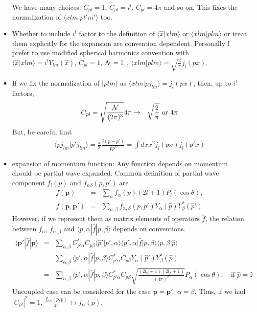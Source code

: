 \documentclass[10pt]{book}
\def\bm{\boldsymbol}
\newcommand{\bea}{\begin{eqnarray}}
\newcommand{\eea}{\end{eqnarray}}
\newcommand{\no}{\nonumber \\}
\def\vp{{\bm p}}
\def\la{\langle}
\def\ra{\rangle}
\begin{document}
\begin{itemize}
  We have many choices: $C_{pl}=1$, $C_{pl}=i^l$, $C_{pl}=4\pi$
  and so on. This fixes the normalization of $\la xlm|p l'm'\ra$ too.

\item Whether to include $i^l$ factor to 
the definition of $\la \hat{x}|xlm\ra$ or $\la xlm|plm\ra $ or treat them explicitly
for the expansion are convention dependent. 
Personally I prefer to use modified spherical harmonics convention with 
$\la \hat{x}|xlm\ra =i^l Y_{lm}(\hat{x})$, 
$C_{pl}=1$, 
${\cal N}=1$ , $\la xlm|plm\ra =\sqrt{\frac{2}{\pi} }j_l(px)$.

\item If we fix the normalization of $|p lm\ra $ as
      $\la x lm|p j_{lm}\ra=j_l(px)$, then, up to $i^{l}$ factors,
      \bea 
      C_{pl}=\sqrt{\frac{\cal N}{(2\pi)^3}}4\pi&\to& \sqrt{\frac{2}{\pi}}
                                     \mbox{ or } 4\pi 
      \eea 
      But, be careful that
      \bea 
      \la p j_{lm}|p' j_{lm}\ra =\frac{\pi}{2}\frac{\delta(p-p')}{pp'}
                        =\int dx x^2 j_l(px) j_l(p'x) 
      \eea 
\item expansion of momentum function: Any function depends on momentum chould be partial wave expanded.
      Common definition of partial wave component $f_l(p)$ and $f_{\alpha\beta}(p,p')$ are
      \bea 
      f(\vp)&=&\sum_{\alpha} f_{\alpha}(p) (2l+1) P_l(\cos\theta) ,\no
      f(\vp,\vp')&=&\sum_{\alpha,\beta} f_{\alpha,\beta}(p,p') Y_\alpha(\hat{p}) Y^*_\beta(\hat{p}')   
      \eea 
      However, if we represent them as matrix elements of operators $\hat{f}$, 
      the relation between $f_{\alpha}$, $f_{\alpha,\beta}$ and $\la p,\alpha|\hat{f}|p,\beta\ra $
      depends on conventions.
      \bea 
      \la \vp'|\hat{f}|\vp\ra 
      &=&\sum_{\alpha,\beta} C^*_{p'\alpha} C_{p\beta}\la \hat{p}'|p',\alpha\ra\la p',\alpha|
                           \hat{f}|p,\beta\ra \la p,\beta|\hat{p}\ra \no 
      &=&\sum_{\alpha,\beta} \la p',\alpha|
                                 \hat{f}|p,\beta\ra 
                                C^*_{p'\alpha} C_{p\beta} 
                          Y_\alpha(\hat{p}') Y^*_{\beta}(\hat{p})\no
      &=&\sum_{\alpha,\beta} \la p',\alpha|
                                 \hat{f}|p,\beta\ra 
                                C^*_{p'\alpha} C_{p\beta} 
                          \sqrt{\frac{(2l_\alpha+1)(2l_\beta+1)}{(4\pi)^2}}
                          P_\alpha(\cos\theta),\quad \mbox{if }\hat{p}=\hat{z}
      \eea 
      Uncoupled case can be considered for the case $\vp=\vp'$, $\alpha=\beta$.
      Thus, if we had $|C_{pl}|^2=1$, 
      $\frac{f_{\alpha\alpha}(p,p)}{4\pi}\leftrightarrow f_\alpha(p)$.
      

\end{itemize}
\end{document}
